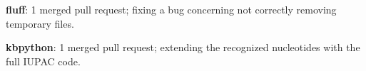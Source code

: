 \noindent
\textbf{fluff}: 1 merged pull request; fixing a bug concerning not correctly removing temporary files.
\newline

\noindent
\textbf{kbpython}: 1 merged pull request; extending the recognized nucleotides with the full IUPAC code.
\newline


\newpage